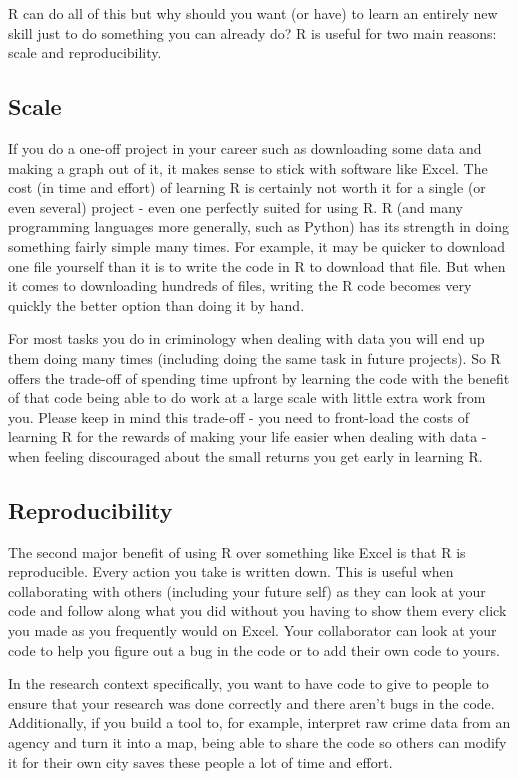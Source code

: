 \documentclass[
  12pt,
  openany]{book}
\begin{document}
R can do all of this but why should you want (or have) to learn an entirely new skill just to do something you can already do? R is useful for two main reasons: scale and reproducibility.

\hypertarget{scale}{%
\subsection{Scale}\label{scale}}

If you do a one-off project in your career such as downloading some data and making a graph out of it, it makes sense to stick with software like Excel. The cost (in time and effort) of learning R is certainly not worth it for a single (or even several) project - even one perfectly suited for using R. R (and many programming languages more generally, such as Python) has its strength in doing something fairly simple many times. For example, it may be quicker to download one file yourself than it is to write the code in R to download that file. But when it comes to downloading hundreds of files, writing the R code becomes very quickly the better option than doing it by hand.

For most tasks you do in criminology when dealing with data you will end up them doing many times (including doing the same task in future projects). So R offers the trade-off of spending time upfront by learning the code with the benefit of that code being able to do work at a large scale with little extra work from you. Please keep in mind this trade-off - you need to front-load the costs of learning R for the rewards of making your life easier when dealing with data - when feeling discouraged about the small returns you get early in learning R.

\hypertarget{reproducibility}{%
\subsection{Reproducibility}\label{reproducibility}}

The second major benefit of using R over something like Excel is that R is reproducible. Every action you take is written down. This is useful when collaborating with others (including your future self) as they can look at your code and follow along what you did without you having to show them every click you made as you frequently would on Excel. Your collaborator can look at your code to help you figure out a bug in the code or to add their own code to yours.

In the research context specifically, you want to have code to give to people to ensure that your research was done correctly and there aren't bugs in the code. Additionally, if you build a tool to, for example, interpret raw crime data from an agency and turn it into a map, being able to share the code so others can modify it for their own city saves these people a lot of time and effort.
\end{document}
